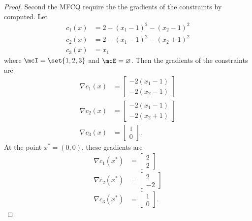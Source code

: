 \documentclass[11pt, oneside]{article}
\begin{document}
\begin{enumerate}
\begin{proof}
      Second the MFCQ require the the gradients of the constraints by computed.
      Let
      \begin{align*}
        c_1(x) &= 2 - (x_1-1)^2 - (x_2-1)^2 \\
        c_2(x) &= 2 - (x_1-1)^2 - (x_2+1)^2 \\
        c_3(x) &= x_1
      \end{align*}
      where $\mcI = \set{1, 2, 3}$ and $\mcE = \varnothing$.
      Then the gradients of the constraints are
      \begin{align*}
        \nabla c_1(x) &=
        \begin{bmatrix}
          -2(x_1 - 1) \\
          -2(x_2 - 1)
        \end{bmatrix} \\
        \nabla c_2(x) &=
        \begin{bmatrix}
          -2(x_1 - 1) \\
          -2(x_2 + 1)
        \end{bmatrix} \\
        \nabla c_3(x) &=
        \begin{bmatrix}
          1 \\
          0
        \end{bmatrix}.
      \end{align*}
      At the point $x^* = (0, 0)$, these gradients are
      \begin{align*}
        \nabla c_1(x^*) &=
        \begin{bmatrix}
          2 \\
          2 
        \end{bmatrix} \\
        \nabla c_2(x^*) &=
        \begin{bmatrix}
          2 \\
          -2
        \end{bmatrix} \\
        \nabla c_3(x^*) &=
        \begin{bmatrix}
          1 \\
          0
        \end{bmatrix}.
      \end{align*}



\end{proof}
\end{enumerate}
\end{document}
